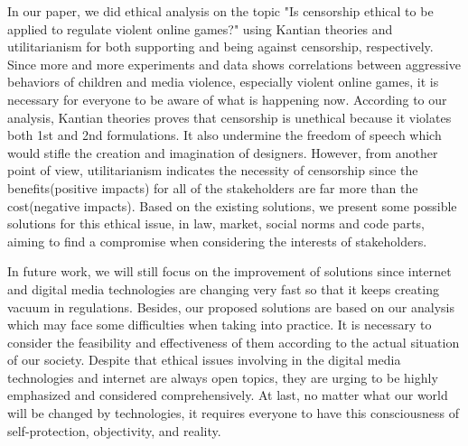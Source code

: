 
In our paper, we did ethical analysis on the topic "Is censorship ethical to be applied to regulate violent online games?" using Kantian theories and utilitarianism for both supporting and being against censorship, respectively. Since more and more experiments and data shows correlations between aggressive behaviors of children and media violence, especially violent online games, it is necessary for everyone to be aware of what is happening now. According to our analysis, Kantian theories proves that censorship is unethical because it violates both 1st and 2nd formulations. It also undermine the freedom of speech which would stifle the creation and imagination of designers. However, from another point of view, utilitarianism indicates the necessity of censorship since the benefits(positive impacts) for all of the stakeholders are far more than the cost(negative impacts). Based on the existing solutions, we present some possible solutions for this ethical issue, in law, market, social norms and code parts, aiming to find a compromise when considering the interests of stakeholders.

In future work, we will still focus on the improvement of solutions since internet and digital media technologies are changing very fast so that  it keeps creating vacuum in regulations. Besides, our proposed solutions are based on our analysis which may face some difficulties when taking into practice. It is necessary to consider the feasibility and effectiveness of them according to the actual situation of our society. Despite that ethical issues involving in the digital media technologies and internet are always open topics, they are urging to be highly emphasized and considered comprehensively. At last, no matter what our world will be changed by technologies, it requires everyone to have this consciousness of self-protection, objectivity, and reality.